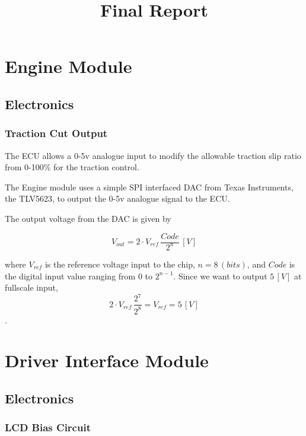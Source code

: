\documentclass[a4paper,10pt]{scrreprt}
\title{Final Report}
\author{}
\begin{document}
\maketitle

\begin{abstract}
\end{abstract}

\section{Engine Module}

\subsection{Electronics}

\subsubsection{Traction Cut Output}

The ECU allows a 0-5v analogue input to modify the allowable traction slip ratio from 0-100\% for the traction control.

The Engine module uses a simple SPI interfaced DAC from Texas Instruments, the TLV5623, to output the 0-5v analogue signal to the ECU.

The output voltage from the DAC is given by 

  \begin{equation}
    V_{out}=2\cdot{V_{ref}}\,\frac{Code}{2^n}\,[V]
  \end{equation} 

where $V_{ref}$ is the reference voltage input to the chip, $n=8\,(bits)$, and $Code$ is the digital input value ranging from $0$ to $2^{n-1}$. Since we want to output $5\,[V]$ at fullscale input,
  \begin{equation}
    2\cdot{V_{ref}}\,\frac{2^7}{2^8}=V_{ref}=5\,[V]
  \end{equation}.

\section{Driver Interface Module}

\subsection{Electronics}

\subsubsection{LCD Bias Circuit}
\end{document}
